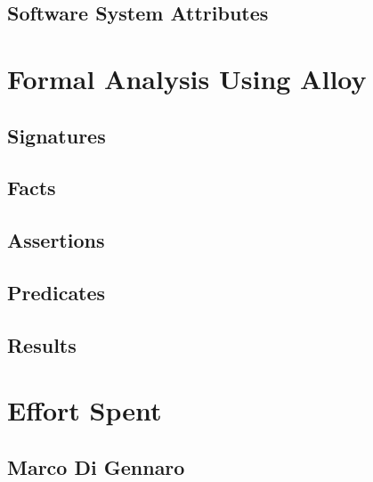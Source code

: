 \documentclass[10pt,openany]{book}
\begin{document}
	\section{Software System Attributes}

		

\chapter{Formal Analysis Using Alloy}\label{chapt:sum}

	\section{Signatures}

		

	\section{Facts}

		

	\section{Assertions}

		

	\section{Predicates}

		

	\section{Results}

		

\chapter{Effort Spent}\label{chapt:sum}

	\section{Marco Di Gennaro}
\end{document}
